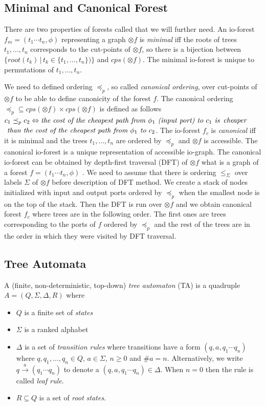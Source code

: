 \subsection{Minimal and Canonical Forest}
\label{subsec:mcforest}

There are two properties of forests called that we will further need.
An io-forest $f_m=(t_1 \cdots t_n, \phi)$ representing a graph $\otimes f$ is \emph{minimal}
iff the roots of trees $t_1,\ldots,t_n$ corresponds to the cut-points of $\otimes f$,
so there is a bijection between $\{root(t_k)\,|\, t_k \in \{t_1, \ldots, t_n\} )\}$ and $cps(\otimes f)$.
The minimal io-forest is unique to permutations of $t_1,\ldots,t_n$.

We need to defined ordering $\preceq_p$, so called \emph{canonical ordering}, over cut-points of $\otimes f$ to be able to define canonicity of the forest $f$.
The canonical ordering $\preceq_p \subseteq cps(\otimes f) \times cps(\otimes f)$ is defined as follows $c_1 \preceq_p c_2 \Leftrightarrow \emph{the cost of the cheapest path from }
\phi_1 \emph{ (input port) to } c_1 \emph{ is}$ $\emph{cheaper}$ $\emph{ than the cost of the cheapest path from } \phi_1 \emph{ to } c_2$.
The io-forest $f_c$ is \emph{canonical} iff it is minimal and the trees $t_1,\ldots, t_n$ are ordered by $\preceq_p$ and $\otimes f$ is accessible.
The canonical io-forest is a unique representation of accessible io-graph.
The canonical io-forest can be obtained by depth-first traversal (DFT) \cite{taocp} of $\otimes f$ what is a graph of a forest $f = (t_1 \cdots t_n, \phi)$ \cite{forester11}.
We need to assume that there is ordering $\leq_\Sigma$ over labels $\Sigma$ of $\otimes f$ before description of DFT method.
We create a stack of nodes initialized with input and output ports ordered by $\preceq_p$ when the smallest node is on the top of the stack.
Then the DFT is run over $\otimes f$ and we obtain canonical forest $f_c$ where trees are in the following order.
The first ones are trees corresponding to the ports of $f$ ordered by $\preceq_p$ and the rest of the trees are in the order
in which they were visited by DFT traversal.


\subsection{Tree Automata}
\label{subsec:ta}

A (finite, non-deterministic, top-down) \emph{tree automaton} (TA) is a
quadruple $A = (Q, \Sigma, \Delta, R)$ where
\begin{itemize}
	\item $Q$ is a finite set of \emph{states}
	\item $\Sigma$ is a ranked alphabet
	\item $\Delta$ is a set of \emph{transition rules} where transitions have a form $(q,a,q_1 \cdots q_n)$ where $q,q_1,\ldots,q_n \in Q$, $a \in \Sigma$, $n \geq 0$ and $\#a = n$.
		Alternatively, we write $q \xrightarrow{a} (q_1 \cdots q_n)$ to denote a $(q,a,q_1 \cdots q_n) \in \Delta$.
		When $n=0$ then the rule is called \emph{leaf rule}.
	\item $R \subseteq Q$ is a set of \emph{root states}.
\end{itemize}

